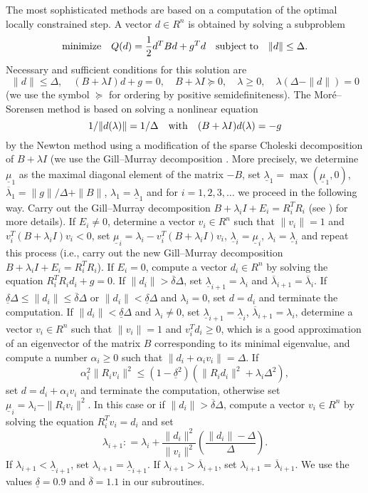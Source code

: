 \documentclass{esub2acm}
\newcommand{\be}{\begin{equation}}
\newcommand{\ee}{\end{equation}}
\begin{document}
\noindent The most sophisticated methods are based on a computation of the
optimal locally constrained step. A vector $d \in R^n$ is obtained by
solving a subproblem
%
\be
\label{34}
{\rm minimize} \quad Q(d) = \frac12 d^T B d + g^T d
\quad {\rm subject \; to} \quad \|d\| \leq \Delta.
\ee
%
Necessary and sufficient conditions for this solution are
%
\be
\label{35}
\|d\|\leq\Delta, \quad (B + \lambda I)d + g  =  0, \quad
B + \lambda I \succeq 0,\quad \lambda \geq 0, \quad \lambda (\Delta - \|d\|) = 0
\ee
%
(we use the symbol $\succeq$ for ordering by positive semidefiniteness). The
Mor\'{e}--Sorensen method \cite{mos1} is based on solving a nonlinear equation
%
$$1 / \|d(\lambda)\| = 1 / \Delta \quad {\rm with} \quad
(B + \lambda I) d(\lambda) = -g$$
%
by the Newton method using a modification of the sparse Choleski decomposition
of $B + \lambda I$ (we use the Gill--Murray decomposition \cite{gim1}. More
precisely, we determine $\underline{\mu}_1$ as the maximal diagonal element
of the matrix $-B$, set $\underline{\lambda}_1 = \max (\underline{\mu}_1, 0)$,
$\overline{\lambda}_1 = \| g \| / \Delta + \| B \|$, $\lambda_1 = \underline{\lambda}_1$
and for $i = 1,2,3, \dots$ we proceed in the following way. Carry out the Gill--Murray
decomposition $B + \lambda_i I + E_i = R_i^T R_i$ (see \cite{gim1}) for more details).
If $E_i \neq 0$, determine a vector $v_i \in R^n$ such that $\| v_i \| = 1$
and $v_i^T (B + \lambda_i I) v_i < 0$, set $\underline{\mu}_i =
\lambda_i - v_i^T (B + \lambda_i I) v_i$, $\underline{\lambda}_i = \underline{\mu}_i$,
$\lambda_i = \underline{\lambda}_i$ and repeat this process (i.e., carry out
the new Gill--Murray decomposition $B + \lambda_i I + E_i = R_i^T R_i$).
If $E_i = 0$, compute a vector $d_i \in R^n$ by solving the equation
$R_i^TR_i d_i + g = 0$. If $\| d_i \| > \overline{\delta} \Delta$, set
$\underline{\lambda}_{i+1} = \lambda_i$ and $\overline{\lambda}_{i+1} = \overline{\lambda}_i$.
If $\underline{\delta} \Delta \leq \| d_i \| \leq \overline{\delta} \Delta$ or
$\| d_i \| < \underline{\delta} \Delta$ and $\lambda_i = 0$, set $d = d_i$ and
terminate the computation.
If $\| d_i \| < \underline{\delta} \Delta$ and
$\lambda_i \neq 0$, set $\underline{\lambda}_{i+1} = \underline{\lambda}_i$,
$\overline{\lambda}_{i+1} = \lambda_i$, determine a vector $v_i \in R^n$
such that $\| v_i \| = 1$ and  $v_i^T d_i \geq 0$, which is a good approximation
of an eigenvector of the matrix $B$ corresponding to its minimal eigenvalue, and compute
a number $\alpha_i \geq 0$ such that $\| d_i + \alpha_i v_i \| = \Delta$.
If
%
$$\alpha_i^2 \| R_i v_i \|^2 \leq (1 - \underline{\delta}^2)
(\|R_i d_i\|^2 + \lambda_i \Delta^2),$$
%
set $d = d_i + \alpha_i v_i$ and terminate the computation,
otherwise set $\underline{\mu}_i = \lambda_i - \| R_i v_i \|^2$. In this case or if
$\| d_i \| > \overline{\delta} \Delta$, compute a vector $v_i \in R^n$ by solving the
equation $R_i^T v_i = d_i$ and set
%
$$\lambda_{i+1}: = \lambda_i + \frac{\| d_i \|^2}{\| v_i \|^2}
\left( \frac{\| d_i \| - \Delta}{\Delta} \right).$$
%
If $\lambda_{i+1} < \underline{\lambda}_{i+1}$, set
$\lambda_{i+1} = \underline{\lambda}_{i+1}$.
If $\lambda_{i+1} > \overline{\lambda}_{i+1}$, set
$\lambda_{i+1} = \overline{\lambda}_{i+1}$. We use the values $\underline{\delta} = 0.9$
and $\overline{\delta} = 1.1$ in our subroutines.
\end{document}
